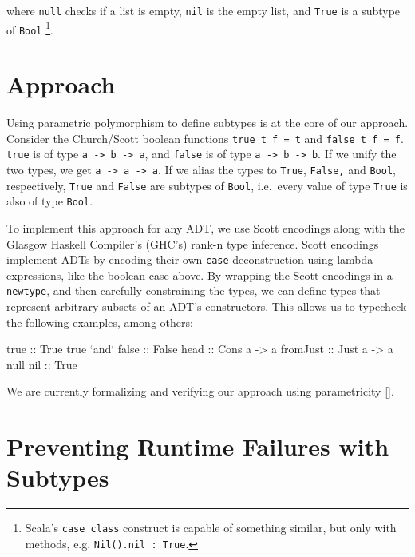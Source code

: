 \documentclass[]{article}
\newenvironment{Shaded}{}{}
\newcommand{\DataTypeTok}[1]{\textcolor[rgb]{0.56,0.13,0.00}{{#1}}}
\newcommand{\OtherTok}[1]{\textcolor[rgb]{0.00,0.44,0.13}{{#1}}}
\newcommand{\NormalTok}[1]{{#1}}
\begin{document}
where \texttt{null} checks if a list is empty, \texttt{nil} is the empty
list, and \texttt{True} is a subtype of \texttt{Bool} \footnote{Scala's
  \texttt{case class} construct is capable of something similar, but
  only with methods, e.g. \texttt{Nil().nil : True}.}.

\section{Approach}\label{approach}

Using parametric polymorphism to define subtypes is at the core of our
approach. Consider the Church/Scott boolean functions
\texttt{true t f = t} and \texttt{false t f = f}. \texttt{true} is of
type \texttt{a -\textgreater{} b -\textgreater{} a}, and \texttt{false}
is of type \texttt{a -\textgreater{} b -\textgreater{} b}. If we unify
the two types, we get \texttt{a -\textgreater{} a -\textgreater{} a}. If
we alias the types to \texttt{True}, \texttt{False,} and \texttt{Bool},
respectively, \texttt{True} and \texttt{False} are subtypes of
\texttt{Bool}, i.e.~every value of type \texttt{True} is also of type
\texttt{Bool}.

To implement this approach for any ADT, we use Scott encodings along
with the Glasgow Haskell Compiler's (GHC's) rank-n type inference. Scott
encodings implement ADTs by encoding their own \texttt{case}
deconstruction using lambda expressions, like the boolean case above. By
wrapping the Scott encodings in a \texttt{newtype}, and then carefully
constraining the types, we can define types that represent arbitrary
subsets of an ADT's constructors. This allows us to typecheck the
following examples, among others:

\begin{Shaded}
\begin{Highlighting}[]
\OtherTok{   true ::} \DataTypeTok{True}
   \NormalTok{true }\OtherTok{`and` false ::} \DataTypeTok{False}
\OtherTok{   head ::} \DataTypeTok{Cons} \NormalTok{a }\OtherTok{->} \NormalTok{a}
\OtherTok{   fromJust ::} \DataTypeTok{Just} \NormalTok{a }\OtherTok{->} \NormalTok{a}
   \NormalTok{null}\OtherTok{ nil ::} \DataTypeTok{True}
\end{Highlighting}
\end{Shaded}

We are currently formalizing and verifying our approach using
parametricity {[}\cite{wadler1989theorems}{]}.

\section{Preventing Runtime Failures with
Subtypes}\label{preventing-runtime-failures-with-subtypes}
\end{document}

